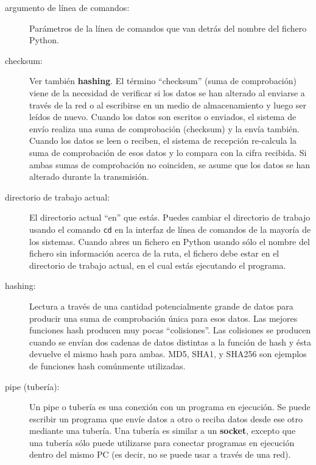 \begin{description}

\item[argumento de línea de comandos:] Parámetros de la línea de comandos que van detrás del nombre
del fichero Python.

\item[checksum:] Ver también {\bf hashing}.  El término ``checksum'' (suma de comprobación)
viene de la necesidad de verificar si los datos se han alterado al
enviarse a través de la red o al escribirse en un medio de almacenamiento y luego
ser leídos de nuevo. Cuando los datos son escritos o enviados, el sistema de envío
realiza una suma de comprobación (checksum) y la envía también. Cuando los
datos se leen o reciben, el sistema de recepción re-calcula la suma de comprobación
de esos datos y lo compara con la cifra recibida. Si ambas sumas de comprobación no coinciden,
se asume que los datos se han alterado durante la transmisión.

\item[directorio de trabajo actual:] El directorio actual ``en''
que estás. Puedes cambiar el directorio de trabajo usando el comando
{\tt cd} en la interfaz de línea de comandos de la mayoría de los sistemas.
Cuando abres un fichero en Python usando sólo el nombre del fichero sin información
acerca de la ruta, el fichero debe estar en el directorio de trabajo actual,
en el cual estás ejecutando el programa.

\item[hashing:] Lectura a través de una cantidad potencialmente grande de datos
para producir una suma de comprobación única para esos datos. Las mejores funciones hash
producen muy pocas ``colisiones''. Las colisiones se producen cuando se envían dos cadenas de datos
distintas a la función de hash y ésta devuelve el mismo hash para ambas.
MD5, SHA1, y SHA256 son ejemplos de funciones hash comúnmente utilizadas.

\item[pipe (tubería):] Un pipe o tubería es una conexión con un programa en ejecución. Se
puede escribir un programa que envíe datos a otro o reciba datos desde ese otro
mediante una tubería. Una tubería es similar a un
{\bf socket}, excepto que una tubería sólo puede utilizarse
para conectar programas en ejecución dentro del mismo PC
(es decir, no se puede usar a través de una red).


\end{description}
